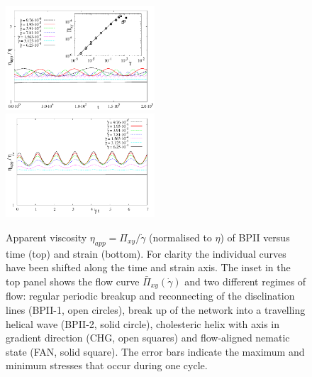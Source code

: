 \documentclass[8.5pt,twoside,twocolumn]{article}
\newcommand{\gd}{\dot{\gamma}}
\begin{document}
\begin{figure}[htpb]
\includegraphics[width=0.495\textwidth]{stress_bp2.pdf}
\includegraphics[width=0.495\textwidth]{stress_vs_strain_bp2.pdf}
\caption{Apparent viscosity $\eta_{app}=\Pi_{xy}/\gd$ (normalised to $\eta$) 
of BPII versus time (top) and strain (bottom). 
For clarity the individual curves have been shifted along the time and strain axis. 
The inset in the top panel 
shows the flow curve $\bar{\Pi}_{xy}(\gd)$ and two different regimes of flow: 
regular periodic breakup and reconnecting of the disclination lines (BPII-1, open circles), 
break up of the network into a travelling helical wave (BPII-2, solid circle), 
cholesteric helix with axis in gradient direction (CHG, open squares)
and flow-aligned nematic state (FAN, solid square).
The error bars indicate the maximum and minimum stresses that occur during one cycle.}
\label{bp2-rheo}
\end{figure}
\end{document}
